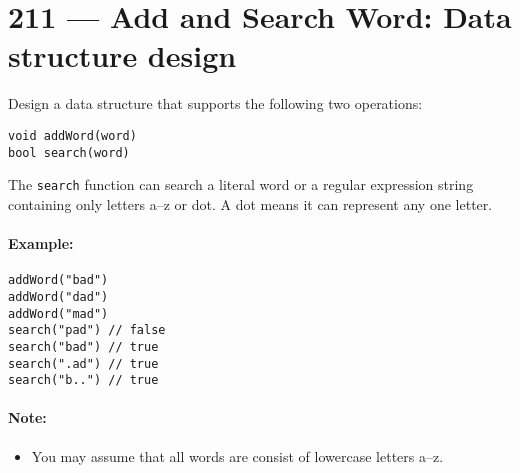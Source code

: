 \section{211 --- Add and Search Word: Data structure design}
Design a data structure that supports the following two operations:
\begin{lstlisting}[style=customc]
void addWord(word)
bool search(word)
\end{lstlisting}
The \texttt{search} function can search a literal word or a regular expression string containing only letters a--z or dot. A dot means it can represent any one letter.
\paragraph{Example:}
\setcounter{lstlisting}{0}
\begin{lstlisting}[style=customc]
addWord("bad")
addWord("dad")
addWord("mad")
search("pad") // false
search("bad") // true
search(".ad") // true
search("b..") // true
\end{lstlisting}
\paragraph{Note:}
\begin{itemize}
\item You may assume that all words are consist of lowercase letters a--z.
\end{itemize}
